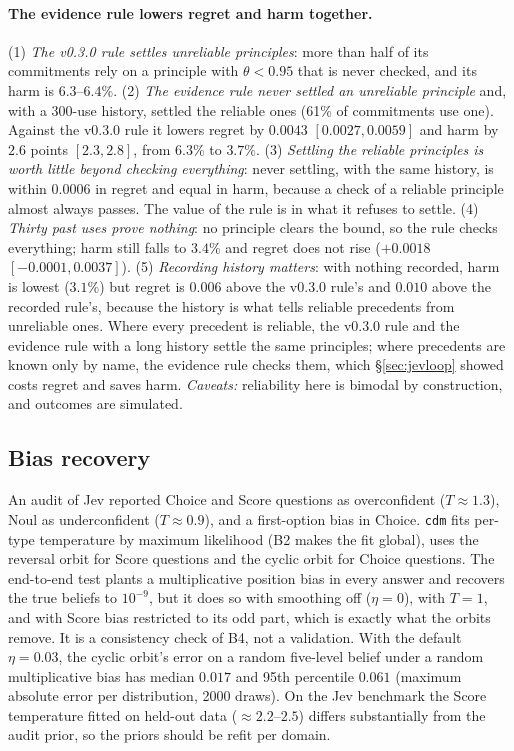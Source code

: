 \documentclass[11pt]{article}
\theoremstyle{definition}
\begin{document}
\paragraph{The evidence rule lowers regret and harm together.} (1) \emph{The v0.3.0 rule settles
unreliable principles}: more than half of its commitments rely on a principle with $\theta<0.95$ that
is never checked, and its harm is $6.3$--$6.4\%$. (2) \emph{The evidence rule never settled an
unreliable principle} and, with a 300-use history, settled the reliable ones (61\% of commitments use
one). Against the v0.3.0 rule it lowers regret by $0.0043$ $[0.0027,0.0059]$ and harm by $2.6$ points
$[2.3,2.8]$, from $6.3\%$ to $3.7\%$. (3) \emph{Settling the reliable principles is worth little beyond
checking everything}: never settling, with the same history, is within $0.0006$ in regret and equal
in harm, because a check of a reliable principle almost always passes. The value of the rule is in
what it refuses to settle. (4) \emph{Thirty past uses prove nothing}: no principle clears the bound,
so the rule checks everything; harm still falls to $3.4\%$ and regret does not rise ($+0.0018$
$[-0.0001,0.0037]$). (5) \emph{Recording history matters}: with nothing recorded, harm is lowest
($3.1\%$) but regret is $0.006$ above the v0.3.0 rule's and $0.010$ above the recorded rule's, because the history is what tells reliable precedents
from unreliable ones. Where every precedent is reliable, the v0.3.0 rule and the evidence rule with a
long history settle the same principles; where precedents are known only by name, the evidence rule
checks them, which \S\ref{sec:jevloop} showed costs regret and saves harm. \emph{Caveats:} reliability
here is bimodal by construction, and outcomes are simulated.

\subsection{Bias recovery}\label{sec:biasrec}

An audit of Jev reported Choice and Score questions as overconfident ($T\approx1.3$), Noul as
underconfident ($T\approx0.9$), and a first-option bias in Choice. \texttt{cdm} fits per-type
temperature by maximum likelihood (B2 makes the fit global), uses the reversal orbit for Score
questions and the cyclic orbit for Choice questions. The end-to-end test plants a multiplicative
position bias in every answer and recovers the true beliefs to $10^{-9}$, but it does so with
smoothing off ($\eta=0$), with $T=1$, and with Score bias restricted to its odd part, which is
exactly what the orbits remove. It is a consistency check of B4, not a validation. With the default
$\eta=0.03$, the cyclic orbit's error on a random five-level belief under a random multiplicative bias
has median $0.017$ and 95th percentile $0.061$ (maximum absolute error per distribution, 2000 draws).
On the Jev benchmark the Score temperature fitted on held-out data ($\approx2.2$--$2.5$) differs
substantially from the audit prior, so the priors should be refit per domain.
\end{document}
